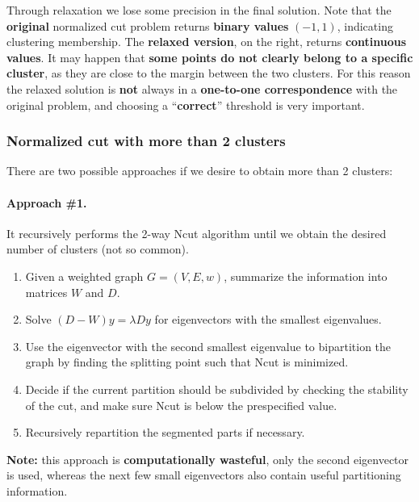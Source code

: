 Through relaxation we lose some precision in the final solution. Note that the \textbf{original} normalized cut problem returns \textbf{binary values} $(-1,1)$, indicating clustering membership. The \textbf{relaxed version}, on the right, returns \textbf{continuous values}. It may happen that \textbf{some points do not clearly belong to a specific cluster}, as they are close to the margin between the two clusters. For this reason the relaxed solution is \textbf{not} always in a \textbf{one-to-one correspondence} with the original problem, and choosing a ``\textbf{correct}'' threshold is very important.

\subsubsection{Normalized cut with more than 2 clusters}
There are two possible approaches if we desire to obtain more than 2 clusters:
\paragraph*{Approach \#1.} It recursively performs the 2-way Ncut algorithm until we obtain the desired number of clusters (not so common).
\begin{enumerate}
	\item Given a weighted graph $G=(V,E,w)$, summarize the information into matrices $W$ and $D$.
	\item Solve $(D-W)y = \lambda Dy$ for eigenvectors with the smallest eigenvalues.
	\item Use the eigenvector with the second smallest eigenvalue to bipartition the graph by finding the splitting point such that Ncut is minimized.
	\item Decide if the current partition should be subdivided by checking the stability of the cut, and make sure Ncut is below the prespecified value.
	\item Recursively repartition the segmented parts if necessary.
\end{enumerate}
\textbf{Note:} this approach is \textbf{computationally wasteful}, only the second eigenvector is used, whereas the next few small eigenvectors also contain useful partitioning information.

